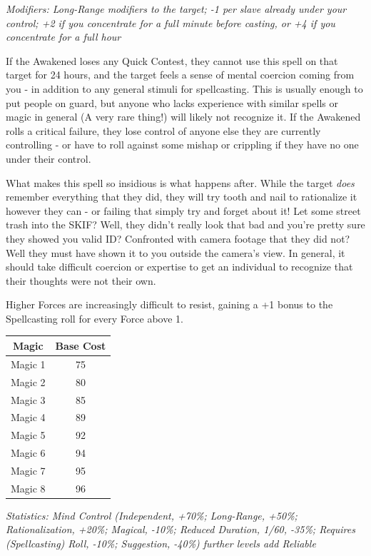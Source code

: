 \begin{multicols}{3}
	\textcolor{NavyBlue}{\textit{Modifiers: Long-Range modifiers to the target; -1 per slave already under your control; +2 if you concentrate for a full minute before casting, or +4 if you concentrate for a full hour}}
	
	If the Awakened loses any Quick Contest, they cannot use this spell on that target for 24 hours, and the target feels a sense of mental coercion coming from you - in addition to any general stimuli for spellcasting. This is usually enough to put people on guard, but anyone who lacks experience with similar spells or magic in general (A very rare thing!) will likely not recognize it. If the Awakened rolls a critical failure, they lose control of anyone else they are currently controlling - or have to roll against some mishap or crippling if they have no one under their control.
	
	What makes this spell so insidious is what happens after. While the target \textit{does} remember everything that they did, they will try tooth and nail to rationalize it however they can - or failing that simply try and forget about it! Let some street trash into the SKIF? Well, they didn't really look that bad and you're pretty sure they showed you valid ID? Confronted with camera footage that they did not? Well they must have shown it to you outside the camera's view. In general, it should take difficult coercion or expertise to get an individual to recognize that their thoughts were not their own.
	
	Higher Forces are increasingly difficult to resist, gaining a +1 bonus to the Spellcasting roll for every Force above 1.
	
	\begin{center}
		\begin{tabular}{|c|c|}
			\hline
			Magic & Base Cost \\
			\hline
			\hline
			Magic 1 & 75 \\
			Magic 2 & 80 \\
			Magic 3 & 85 \\
			Magic 4 & 89 \\
			Magic 5 & 92 \\
			Magic 6 & 94 \\
			Magic 7 & 95 \\
			Magic 8 & 96 \\
			\hline
		\end{tabular}
	\end{center}	
	
	\textcolor{OliveGreen}{\textit{Statistics: Mind Control (Independent, +70\%; Long-Range, +50\%; Rationalization, +20\%; Magical, -10\%; Reduced Duration, 1/60, -35\%; Requires (Spellcasting) Roll, -10\%; Suggestion, -40\%) further levels add Reliable}}
	

\end{multicols}
